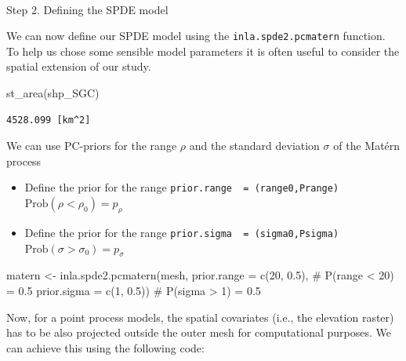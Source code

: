 \documentclass[
  letterpaper,
  DIV=11,
  numbers=noendperiod]{scrartcl}
\makeatletter
\let\oldparagraph\paragraph
\renewcommand{\paragraph}{
    \@ifstar
      \xxxParagraphStar
      \xxxParagraphNoStar
  }
\newcommand{\xxxParagraphStar}[1]{\oldparagraph*{#1}\mbox{}}
\newcommand{\xxxParagraphNoStar}[1]{\oldparagraph{#1}\mbox{}}
\newenvironment{Shaded}{\begin{snugshade}}{\end{snugshade}}
\newcommand{\AttributeTok}[1]{\textcolor[rgb]{0.40,0.45,0.13}{#1}}
\newcommand{\CommentTok}[1]{\textcolor[rgb]{0.37,0.37,0.37}{#1}}
\newcommand{\DecValTok}[1]{\textcolor[rgb]{0.68,0.00,0.00}{#1}}
\newcommand{\FloatTok}[1]{\textcolor[rgb]{0.68,0.00,0.00}{#1}}
\newcommand{\FunctionTok}[1]{\textcolor[rgb]{0.28,0.35,0.67}{#1}}
\newcommand{\NormalTok}[1]{\textcolor[rgb]{0.00,0.23,0.31}{#1}}
\newcommand{\OtherTok}[1]{\textcolor[rgb]{0.00,0.23,0.31}{#1}}
\makeatother
\begin{document}
\paragraph{Step 2. Defining the SPDE
model}\label{step-2.-defining-the-spde-model}

We can now define our SPDE model using the \texttt{inla.spde2.pcmatern}
function. To help us chose some sensible model parameters it is often
useful to consider the spatial extension of our study.

\begin{Shaded}
\begin{Highlighting}[]
\FunctionTok{st\_area}\NormalTok{(shp\_SGC)}
\end{Highlighting}
\end{Shaded}

\begin{verbatim}
4528.099 [km^2]
\end{verbatim}

We can use PC-priors for the range \(\rho\) and the standard deviation
\(\sigma\) of the Matérn process

\begin{itemize}
\item
  Define the prior for the range
  \texttt{prior.range\ \ =\ (range0,Prange)}
  \(\text{Prob}(\rho<\rho_0) = p_{\rho}\)
\item
  Define the prior for the range
  \texttt{prior.sigma\ \ =\ (sigma0,Psigma)}
  \(\text{Prob}(\sigma>\sigma_0) = p_{\sigma}\)
\end{itemize}

\begin{Shaded}
\begin{Highlighting}[]
\NormalTok{matern }\OtherTok{\textless{}{-}} \FunctionTok{inla.spde2.pcmatern}\NormalTok{(mesh,}
                              \AttributeTok{prior.range =} \FunctionTok{c}\NormalTok{(}\DecValTok{20}\NormalTok{, }\FloatTok{0.5}\NormalTok{), }\CommentTok{\# P(range \textless{} 20) = 0.5}
                              \AttributeTok{prior.sigma =} \FunctionTok{c}\NormalTok{(}\DecValTok{1}\NormalTok{, }\FloatTok{0.5}\NormalTok{))  }\CommentTok{\# P(sigma \textgreater{} 1) = 0.5}
\end{Highlighting}
\end{Shaded}

Now, for a point process models, the spatial covariates (i.e., the
elevation raster) has to be also projected outside the outer mesh for
computational purposes. We can achieve this using the following code:
\end{document}

